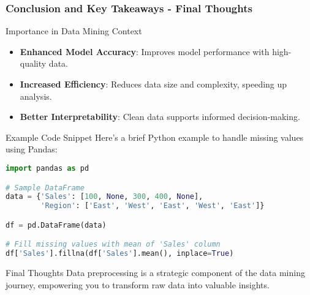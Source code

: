 \documentclass{beamer}
\begin{document}
\begin{frame}[fragile]
    \frametitle{Conclusion and Key Takeaways - Final Thoughts}
    \begin{block}{Importance in Data Mining Context}
        \begin{itemize}
            \item \textbf{Enhanced Model Accuracy}: Improves model performance with high-quality data.
            \item \textbf{Increased Efficiency}: Reduces data size and complexity, speeding up analysis.
            \item \textbf{Better Interpretability}: Clean data supports informed decision-making.
        \end{itemize}
    \end{block}

    \begin{block}{Example Code Snippet}
        Here’s a brief Python example to handle missing values using Pandas:
        \begin{lstlisting}[language=Python]
import pandas as pd

# Sample DataFrame
data = {'Sales': [100, None, 300, 400, None],
        'Region': ['East', 'West', 'East', 'West', 'East']}

df = pd.DataFrame(data)

# Fill missing values with mean of 'Sales' column
df['Sales'].fillna(df['Sales'].mean(), inplace=True)
        \end{lstlisting}
    \end{block}
    
    \begin{block}{Final Thoughts}
        Data preprocessing is a strategic component of the data mining journey, empowering you to transform raw data into valuable insights.
    \end{block}
\end{frame}
\end{document}
